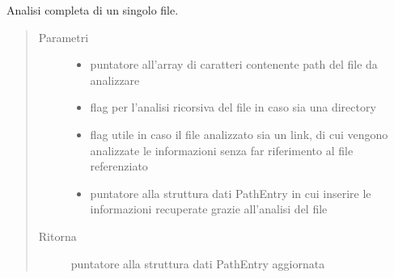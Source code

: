 \documentclass[letterpaper,10pt,italian,openany,oneside]{sphinxmanual}
\begin{document}
\begin{fulllineitems}
\label{\detokenize{code/inputscan:c.scanFilePath}}
Analisi completa di un singolo file.
\begin{quote}\begin{description}
\item[{Parametri}] \leavevmode\begin{itemize}
\item {} 
 \textendash{} puntatore all’array di caratteri contenente path del file da analizzare

\item {} 
 \textendash{} flag per l’analisi ricorsiva del file in caso sia una directory

\item {} 
 \textendash{} flag utile in caso il file analizzato sia un link, di cui vengono analizzate le informazioni senza far riferimento al file referenziato

\item {} 
 \textendash{} puntatore alla struttura dati PathEntry in cui inserire le informazioni recuperate grazie all’analisi del file

\end{itemize}

\item[{Ritorna}] \leavevmode
puntatore alla struttura dati PathEntry aggiornata

\end{description}\end{quote}

\end{fulllineitems}

\end{document}
